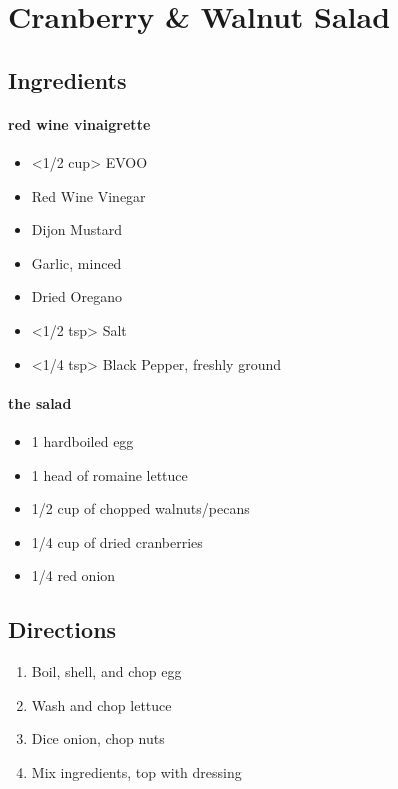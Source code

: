 \section{Cranberry \& Walnut Salad}

\subsection{ Ingredients }

\paragraph{red wine vinaigrette}

\begin{itemize}
  \item <1/2 cup> EVOO
  \item <3 tbs> Red Wine Vinegar
  \item <1 tbs> Dijon Mustard
  \item <2 cloves> Garlic, minced
  \item <1 tbs> Dried Oregano
  \item <1/2 tsp> Salt
  \item <1/4 tsp> Black Pepper, freshly ground
\end{itemize}

\paragraph{the salad}

\begin{itemize}
  \item 1 hardboiled egg
  \item 1 head of romaine lettuce
  \item 1/2 cup of chopped walnuts/pecans
  \item 1/4 cup of dried cranberries
  \item 1/4 red onion
\end{itemize}

\subsection{ Directions }

\begin{enumerate}
  \item Boil, shell, and chop egg
  \item Wash and chop lettuce
  \item Dice onion, chop nuts
  \item Mix ingredients, top with dressing
\end{enumerate}
